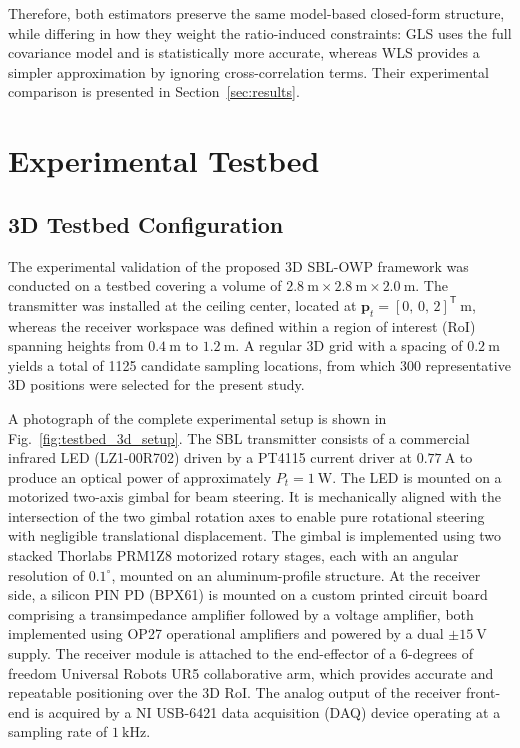\documentclass[conference]{IEEEtran}
\begin{document}
Therefore, both estimators preserve the same model-based closed-form structure, while differing in how they weight the ratio-induced constraints: GLS uses the full covariance model and is statistically more accurate, whereas WLS provides a simpler approximation by ignoring cross-correlation terms. Their experimental comparison is presented in Section~\ref{sec:results}.






\section{Experimental Testbed}
\label{sec:testbed}

\subsection{3D Testbed Configuration}
\label{subsec:testbed_configuration}


The experimental validation of the proposed 3D SBL-OWP framework was conducted on a testbed covering a volume of $2.8~\mathrm{m}\times2.8~\mathrm{m}\times2.0~\mathrm{m}$. The transmitter was installed at the ceiling center, located at $\mathbf{p}_t=[0,\,0,\,2]^\mathsf{T}~\mathrm{m}$, whereas the receiver workspace was defined within a region of interest (RoI) spanning heights from $0.4~\mathrm{m}$ to $1.2~\mathrm{m}$. A regular 3D grid with a spacing of $0.2~\mathrm{m}$ yields a total of 1125 candidate sampling locations, from which 300 representative 3D positions were selected for the present study.

A photograph of the complete experimental setup is shown in Fig.~\ref{fig:testbed_3d_setup}. The SBL transmitter consists of a commercial infrared LED (LZ1-00R702) driven by a PT4115 current driver at $0.77~\mathrm{A}$ to produce an optical power of approximately $P_t=1~\mathrm{W}$. The LED is mounted on a motorized two-axis gimbal for beam steering. It is mechanically aligned with the intersection of the two gimbal rotation axes to enable pure rotational steering with negligible translational displacement. The gimbal is implemented using two stacked Thorlabs PRM1Z8 motorized rotary stages, each with an angular resolution of $0.1^\circ$, mounted on an aluminum-profile structure. At the receiver side, a silicon PIN PD (BPX61) is mounted on a custom printed circuit board comprising a transimpedance amplifier followed by a voltage amplifier, both implemented using OP27 operational amplifiers and powered by a dual $\pm15~\mathrm{V}$ supply. The receiver module is attached to the end-effector of a 6-degrees of freedom Universal Robots UR5 collaborative arm, which provides accurate and repeatable positioning over the 3D RoI. The analog output of the receiver front-end is acquired by a NI USB-6421 data acquisition (DAQ) device operating at a sampling rate of $1~\mathrm{kHz}$. 
\end{document}
